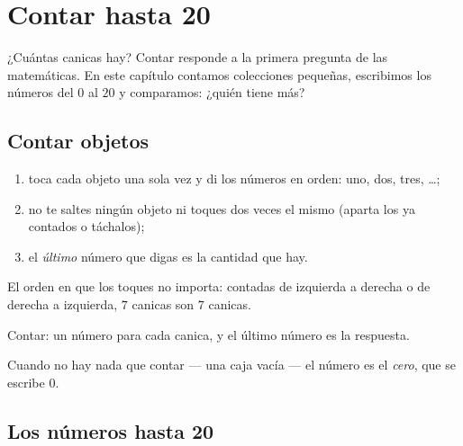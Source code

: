 \chapter{Contar hasta 20}\label{ch:g1:counting}

¿Cuántas canicas hay? Contar responde a la primera pregunta de las
matemáticas. En este capítulo contamos colecciones pequeñas, escribimos
los números del $0$ al $20$ y comparamos: ¿quién tiene más?

\section{Contar objetos}

\begin{method}\label{met:g1:counting:how}
\begin{enumerate}
  \item toca cada objeto una sola vez y di los números en orden: uno,
        dos, tres, \dots;
  \item no te saltes ningún objeto ni toques dos veces el mismo (aparta
        los ya contados o táchalos);
  \item el \emph{último} número que digas es la cantidad que hay.
\end{enumerate}
El orden en que los toques no importa: contadas de izquierda a derecha o
de derecha a izquierda, $7$ canicas son $7$ canicas.
\end{method}

\begin{omfigure}

{\small Contar: un número para cada canica, y el último número es
la respuesta.}
\end{omfigure}

\begin{definition}[El cero]\label{def:g1:counting:zero}
Cuando no hay nada que contar --- una caja vacía --- el número es el
\emph{cero}, que se escribe $0$.
\end{definition}

\section{Los números hasta 20}

